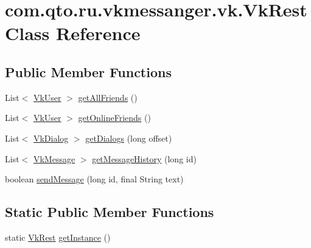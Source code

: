 \hypertarget{classcom_1_1qto_1_1ru_1_1vkmessanger_1_1vk_1_1_vk_rest}{}\section{com.\+qto.\+ru.\+vkmessanger.\+vk.\+Vk\+Rest Class Reference}
\label{classcom_1_1qto_1_1ru_1_1vkmessanger_1_1vk_1_1_vk_rest}
\subsection*{Public Member Functions}
\begin{DoxyCompactItemize}
\item 
List$<$ \hyperlink{classcom_1_1qto_1_1ru_1_1vkmessanger_1_1vk_1_1_vk_user}{Vk\+User} $>$ \hyperlink{classcom_1_1qto_1_1ru_1_1vkmessanger_1_1vk_1_1_vk_rest_ad6499ed5bc2603ec411b09ab6f2ca90b}{get\+All\+Friends} ()
\item 
List$<$ \hyperlink{classcom_1_1qto_1_1ru_1_1vkmessanger_1_1vk_1_1_vk_user}{Vk\+User} $>$ \hyperlink{classcom_1_1qto_1_1ru_1_1vkmessanger_1_1vk_1_1_vk_rest_a62e6abe55f8f5b49923174e5289f0b8c}{get\+Online\+Friends} ()
\item 
List$<$ \hyperlink{classcom_1_1qto_1_1ru_1_1vkmessanger_1_1vk_1_1_vk_dialog}{Vk\+Dialog} $>$ \hyperlink{classcom_1_1qto_1_1ru_1_1vkmessanger_1_1vk_1_1_vk_rest_a0ae1e786b2b53d88ba7543bf10ec8f6d}{get\+Dialogs} (long offset)
\item 
List$<$ \hyperlink{classcom_1_1qto_1_1ru_1_1vkmessanger_1_1vk_1_1_vk_message}{Vk\+Message} $>$ \hyperlink{classcom_1_1qto_1_1ru_1_1vkmessanger_1_1vk_1_1_vk_rest_a5d4c0631b6a8b82be0df10a4070ffec9}{get\+Message\+History} (long id)
\item 
boolean \hyperlink{classcom_1_1qto_1_1ru_1_1vkmessanger_1_1vk_1_1_vk_rest_a7cf09c48ad540385a81ebd4848f33068}{send\+Message} (long id, final String text)
\end{DoxyCompactItemize}
\subsection*{Static Public Member Functions}
\begin{DoxyCompactItemize}
\item 
static \hyperlink{classcom_1_1qto_1_1ru_1_1vkmessanger_1_1vk_1_1_vk_rest}{Vk\+Rest} \hyperlink{classcom_1_1qto_1_1ru_1_1vkmessanger_1_1vk_1_1_vk_rest_a336e0c08f9a4fb34293bc1cf28486112}{get\+Instance} ()
\end{DoxyCompactItemize}


